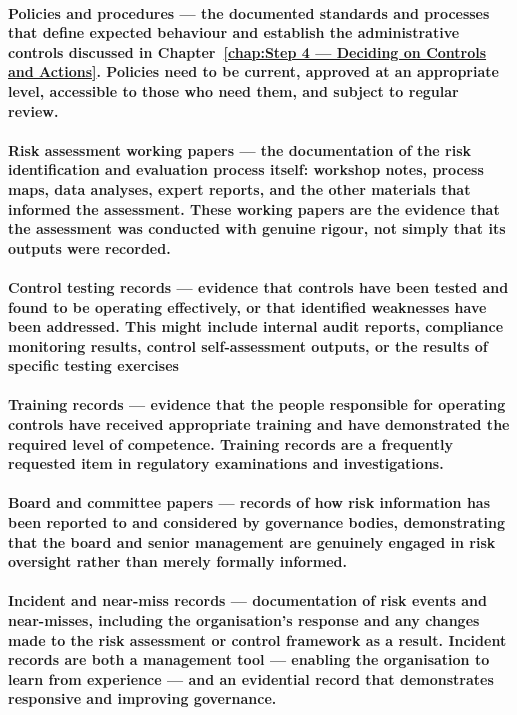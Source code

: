 \paragraph{\textbf{Policies and procedures} — the documented standards and processes that define expected behaviour and establish the administrative controls discussed in Chapter~\ref{chap:Step 4 — Deciding on Controls and Actions}. Policies need to be current, approved at an appropriate level, accessible to those who need them, and subject to regular review.}
\paragraph{\textbf{Risk assessment working papers} — the documentation of the risk identification and evaluation process itself: workshop notes, process maps, data analyses, expert reports, and the other materials that informed the assessment. These working papers are the evidence that the assessment was conducted with genuine rigour, not simply that its outputs were recorded.}
\paragraph{\textbf{Control testing records} — evidence that controls have been tested and found to be operating effectively, or that identified weaknesses have been addressed. This might include internal audit reports, compliance monitoring results, control self-assessment outputs, or the results of specific testing exercises}
\paragraph{\textbf{Training records} — evidence that the people responsible for operating controls have received appropriate training and have demonstrated the required level of competence. Training records are a frequently requested item in regulatory examinations and investigations.}
\paragraph{\textbf{Board and committee papers} — records of how risk information has been reported to and considered by governance bodies, demonstrating that the board and senior management are genuinely engaged in risk oversight rather than merely formally informed.}
\paragraph{\textbf{Incident and near-miss records} — documentation of risk events and near-misses, including the organisation's response and any changes made to the risk assessment or control framework as a result. Incident records are both a management tool — enabling the organisation to learn from experience — and an evidential record that demonstrates responsive and improving governance.}


